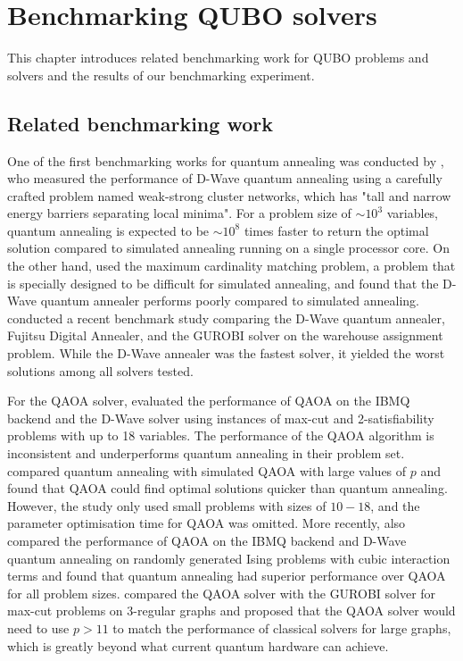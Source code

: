 \chapter{Benchmarking QUBO solvers}\label{benchmark}
This chapter introduces related benchmarking work for QUBO problems and solvers and the results of our benchmarking experiment.

\section{Related benchmarking work}
One of the first benchmarking works for quantum annealing was conducted by , who measured the performance of D-Wave quantum annealing using a carefully crafted problem named weak-strong cluster networks, which has "tall and narrow energy barriers separating local minima". For a problem size of $\sim 10^3$ variables, quantum annealing is expected to be $\sim 10^8$ times faster to return the optimal solution compared to simulated annealing running on a single processor core. On the other hand,  used the maximum cardinality matching problem, a problem that is specially designed to be difficult for simulated annealing, and found that the D-Wave quantum annealer performs poorly compared to simulated annealing.  conducted a recent benchmark study comparing the D-Wave quantum annealer, Fujitsu Digital Annealer, and the GUROBI solver on the warehouse assignment problem. While the D-Wave annealer was the fastest solver, it yielded the worst solutions among all solvers tested.

For the QAOA solver,  evaluated the performance of QAOA on the IBMQ backend and the D-Wave solver using instances of max-cut and 2-satisfiability problems with up to 18 variables. The performance of the QAOA algorithm is inconsistent and underperforms quantum annealing in their problem set.  compared quantum annealing with simulated QAOA with large values of $p$ and found that QAOA could find optimal solutions quicker than quantum annealing. However, the study only used small problems with sizes of $10-18$, and the parameter optimisation time for QAOA was omitted. More recently,  also compared the performance of QAOA on the IBMQ backend and D-Wave quantum annealing on randomly generated Ising problems with cubic interaction terms and found that quantum annealing had superior performance over QAOA for all problem sizes.  compared the QAOA solver with the GUROBI solver for max-cut problems on 3-regular graphs and proposed that the QAOA solver would need to use $p > 11$ to match the performance of classical solvers for large graphs, which is greatly beyond what current quantum hardware can achieve.

